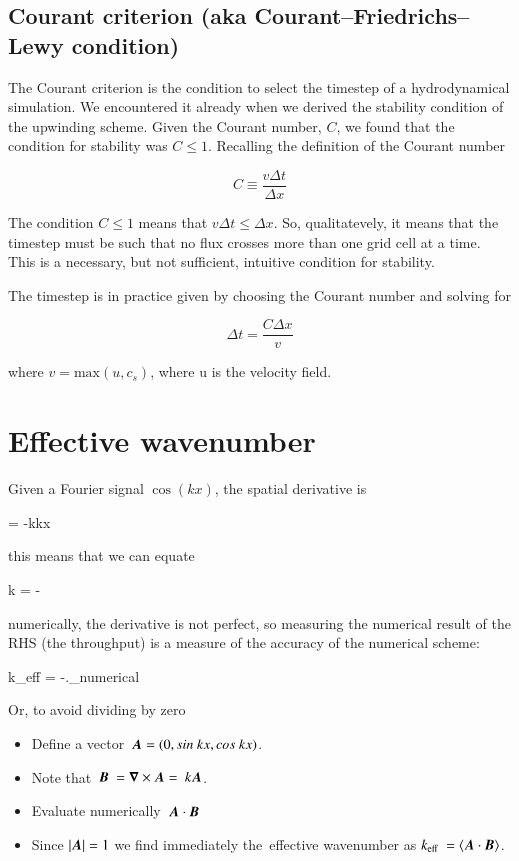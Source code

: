\subsection{Courant criterion (aka Courant–Friedrichs–Lewy condition)}

The Courant criterion is the condition to select the timestep of a hydrodynamical simulation. We encountered it already when we derived the stability condition of the upwinding scheme. Given the Courant number, $C$, we found that the condition for stability was  $C \leq 1$. Recalling the definition of the Courant number

\begin{equation}
C \equiv \frac{v\Delta t}{\Delta x}
\end{equation}

The condition $C \leq 1$ means that $v\Delta t \leq \Delta x$. So, qualitatevely, it means that the timestep must be such that no flux crosses more than one grid cell at a time. This is a necessary, but not sufficient, intuitive condition for stability.

The timestep is in practice given by choosing the Courant number and solving for 

\begin{equation}
\Delta t = \frac{C\Delta x}{v}
\end{equation}

where $v = \mbox{max}(u,c_s) $, where u is the velocity field.


\section{Effective wavenumber}

Given a Fourier signal $\cos(kx)$, the spatial derivative is

\beq
{} = -k\sin kx
\eeq

this means that we can equate

\beq
k = - 
\eeq

numerically, the derivative is not perfect, so measuring the numerical
result of the RHS (the throughput) is a measure of the accuracy of the
numerical scheme:

\beq
k_{\rm eff} = -\left.\right\vert_{\rm numerical} 
\eeq

Or, to avoid dividing by zero

\begin{itemize}

\item Define a vector $\v{A} = (0, sin kx, cos kx)$.
\item Note that $\v{B} = \curl{\v{A}}= k\v{A}$.
\item Evaluate numerically ${\boldsymbol{A}}\cdot {\boldsymbol{B}}$
\item Since $|{\boldsymbol{A}}|=1$ we find immediately the effective wavenumber
  as $k_{\rm eff} = \langle \v{A}\cdot\v{B}\rangle$.

\end{itemize}
  
